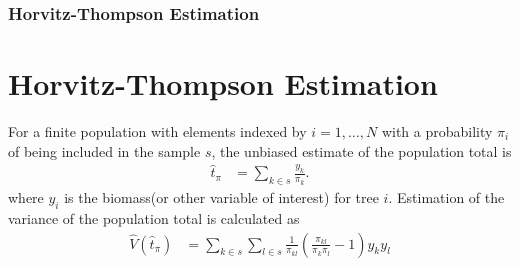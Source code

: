 \documentclass{beamer}
\begin{document}
%
\begin{frame}
  \frametitle{Horvitz-Thompson Estimation}
  \section{Horvitz-Thompson Estimation}
  For a finite population with elements indexed by $i = 1, \ldots, N$ with a probability $\pi_i$ of being included in the sample $s$, the unbiased estimate of the population total is 
  \begin{align*}
    \hat{t}_\pi &  = \sum_{k \in s} \frac{y_k} {\pi_k}.
  \end{align*}
  where $y_i$ is the biomass(or other variable of interest) for tree $i$.\vspace{3mm}
  Estimation of the variance of the population total is calculated as
  \begin{align*}
    \hat{V}(\hat{t}_\pi) &  = \sum_{k \in s} \sum_{l \in s} \frac{1} {\pi_{kl}} \left( \frac{\pi_{kl}} {\pi_k \pi_l} - 1 \right) y_k y_l
  \end{align*}
\end{frame}
\end{document}
